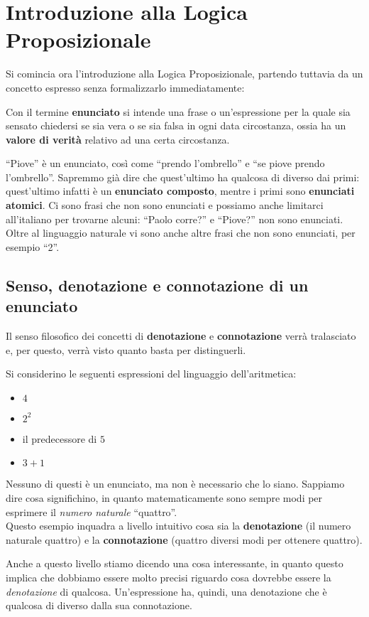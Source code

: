 \chapter{Introduzione alla Logica Proposizionale}
Si comincia ora l'introduzione alla Logica Proposizionale, 
partendo tuttavia da un concetto espresso senza formalizzarlo immediatamente: 
\begin{defi}[Enunciato]
Con il termine \textbf{enunciato} si intende una frase o un'espressione per la 
quale sia sensato chiedersi se sia vera o se sia falsa in ogni data 
circostanza, ossia ha un \textbf{valore di verità} relativo ad una 
certa circostanza. 
\end{defi}
``Piove'' è un enunciato, così come ``prendo l'ombrello'' 
e ``se piove prendo l'ombrello''. Sapremmo già dire che quest'ultimo ha 
qualcosa di diverso dai primi: quest'ultimo infatti è un \textbf{enunciato 
composto}, mentre i primi sono \textbf{enunciati atomici}. Ci sono frasi 
che non sono enunciati e possiamo anche limitarci all'italiano per trovarne 
alcuni: ``Paolo corre?'' e ``Piove?'' non sono enunciati. Oltre al linguaggio naturale 
vi sono anche altre frasi che non sono enunciati, per esempio ``2''. 

\section{Senso, denotazione e connotazione di un enunciato}
Il senso filosofico dei concetti di \textbf{denotazione} e \textbf{connotazione} verrà tralasciato e, per questo, verrà visto quanto basta per distinguerli.

Si considerino le seguenti espressioni del linguaggio dell'aritmetica: 
\begin{itemize}
  \setlength\itemsep{0pt}
  \item $4$
  \item $2^2$
  \item il predecessore di $5$ 
  \item $3+1$
\end{itemize}
Nessuno di questi è un enunciato, ma non è necessario che lo siano. 
Sappiamo dire cosa significhino, in quanto matematicamente sono sempre 
modi per esprimere il \textit{numero naturale} ``quattro''. \\
Questo esempio inquadra a livello intuitivo cosa sia la \textbf{denotazione} (il numero naturale quattro) e la \textbf{connotazione} (quattro diversi modi per ottenere quattro). 

Anche a questo livello stiamo dicendo una cosa interessante, in quanto questo implica che dobbiamo essere molto precisi riguardo cosa dovrebbe essere la \textit{denotazione} di qualcosa. Un'espressione ha, quindi, una denotazione che è qualcosa di diverso dalla sua connotazione.

